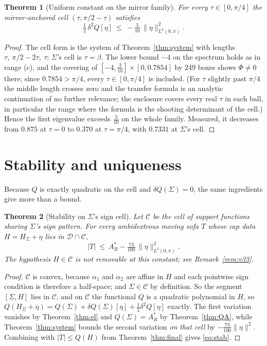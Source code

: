 \documentclass[11pt]{article}
\newtheorem{theorem}{Theorem}
\theoremstyle{definition}
\newcommand{\Sig}{\Sigma}
\begin{document}
\begin{theorem}[Uniform constant on the mirror family]\label{thm:mirroruniform}
For every $\tau\in[0,\pi/4]$ the mirror-anchored cell $(\tau,\pi/2-\tau)$ satisfies
\[
  \tfrac12\,\delta^2Q[\eta]\ \le\ -\tfrac3{10}\,\|\eta\|^2_{L^2(0,\pi)} .
\]
\end{theorem}

\begin{proof}
The cell form is the system of Theorem~\ref{thm:system} with lengths
$\tau,\ \pi/2-2\tau,\ \tau$; $\Sig$'s cell is $\tau=\beta$. The lower bound $-4$ on the
spectrum holds as in range (c), and the covering of
$[-4,\tfrac3{10}]\times[0,0.7854]$ by $249$ boxes shows $\Phi\ne0$ there; since
$0.7854>\pi/4$, every $\tau\in[0,\pi/4]$ is included. (For $\tau$ slightly past $\pi/4$
the middle length crosses zero and the transfer formula is an analytic continuation of no
further relevance; the enclosure covers every real $\tau$ in each ball, in particular the
range where the formula is the shooting determinant of the cell.) Hence the first
eigenvalue exceeds $\tfrac3{10}$ on the whole family. Measured, it decreases from $0.875$
at $\tau=0$ to $0.370$ at $\tau=\pi/4$, with $0.7331$ at $\Sig$'s cell.
\end{proof}


\section{Stability and uniqueness}\label{sec:stab}

Because $Q$ is exactly quadratic on the cell and $\delta Q(\Sig)=0$, the same ingredients
give more than a bound.

\begin{theorem}[Stability on $\Sig$'s sign cell]\label{thm:stab}
Let $\mathcal C$ be the cell of support functions sharing $\Sig$'s sign pattern. For every
ambidextrous moving sofa $T$ whose cap data $H=H_\Sig+\eta$ lies in
$\mathcal D\cap\mathcal C$,
\begin{equation}\label{eq:stab}
  |T|\ \le\ A_R^\ast-\tfrac{73}{100}\,\|\eta\|_{L^2(0,\pi)}^2 .
\end{equation}
The hypothesis $H\in\mathcal C$ is not removable at this constant; see
Remark~\ref{rem:v33}.
\end{theorem}

\begin{proof}
$\mathcal C$ is convex, because $\alpha_1$ and $\alpha_2$ are affine in $H$ and each
pointwise sign condition is therefore a half-space; and $\Sig\in\mathcal C$ by definition. So
the segment $[\Sig,H]$ lies in $\mathcal C$, and on $\mathcal C$ the functional $Q$ is a
quadratic polynomial in $H$, so
$Q(H_\Sig+\eta)=Q(\Sig)+\delta Q(\Sig)[\eta]+\tfrac12\delta^2Q[\eta]$ exactly. The first
variation vanishes by Theorem~\ref{thm:el} and $Q(\Sig)=A_R^\ast$ by
Theorem~\ref{thm:QA}, while Theorem~\ref{thm:system} bounds the second variation \emph{on
that cell} by $-\tfrac{73}{100}\|\eta\|^2$. Combining
with $|T|\le Q(H)$ from Theorem~\ref{thm:final} gives \eqref{eq:stab}.
\end{proof}
\end{document}
